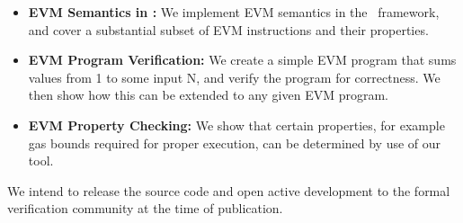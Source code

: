 \begin{itemize}
\item{\bf EVM Semantics in \K{}:} We implement EVM semantics in the \K{}~framework, and
cover a substantial subset of EVM instructions and their properties.
\item{\bf EVM Program Verification:} We create a simple EVM program that sums
values from 1 to some input N, and verify the program for correctness. We then show how this can be extended to any given EVM program.
\item{\bf EVM Property Checking:} We show that certain properties, for example
gas bounds required for proper execution, can be determined by use of our tool.
\end{itemize}

We intend to release the source code and open active development to the formal
verification community at the time of publication.
